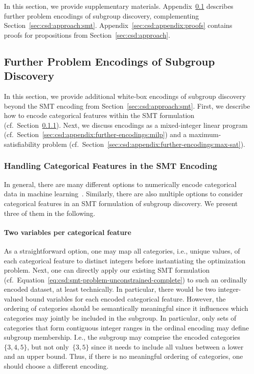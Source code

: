 \documentclass{article}
\theoremstyle{definition}
\begin{document}
In this section, we provide supplementary materials.
Appendix~\ref{sec:csd:appendix:further-encodings} describes further problem encodings of subgroup discovery, complementing Section~\ref{sec:csd:approach:smt}.
Appendix~\ref{sec:csd:appendix:proofs} contains proofs for propositions from Section~\ref{sec:csd:approach}.

\subsection{Further Problem Encodings of Subgroup Discovery}
\label{sec:csd:appendix:further-encodings}

In this section, we provide additional white-box encodings of subgroup discovery beyond the SMT encoding from Section~\ref{sec:csd:approach:smt}.
First, we describe how to encode categorical features within the SMT formulation (cf.~Section~\ref{sec:csd:appendix:further-encodings:smt-categorical}).
Next, we discuss encodings as a mixed-integer linear program (cf.~Section~\ref{sec:csd:appendix:further-encodings:milp}) and a maximum-satisfiability problem (cf.~Section~\ref{sec:csd:appendix:further-encodings:max-sat}).

\subsubsection{Handling Categorical Features in the SMT Encoding}
\label{sec:csd:appendix:further-encodings:smt-categorical}

In general, there are many different options to numerically encode categorical data in machine learning~\cite{matteucci2023benchmark}.
Similarly, there are also multiple options to consider categorical features in an SMT formulation of subgroup discovery.
We present three of them in the following.

\paragraph{Two variables per categorical feature}

As a straightforward option, one may map all categories, i.e., unique values, of each categorical feature to distinct integers before instantiating the optimization problem.
Next, one can directly apply our existing SMT formulation (cf.~Equation~\ref{eq:csd:smt-problem-unconstrained-complete}) to such an ordinally encoded dataset, at least technically.
In particular, there would be two integer-valued bound variables for each encoded categorical feature.
However, the ordering of categories should be semantically meaningful since it influences which categories may jointly be included in the subgroup.
In particular, only sets of categories that form contiguous integer ranges in the ordinal encoding may define subgroup membership.
I.e., the subgroup may comprise the encoded categories~$\{3,4,5\}$, but not only~$\{3,5 \}$ since it needs to include all values between a lower and an upper bound.
Thus, if there is no meaningful ordering of categories, one should choose a different encoding.
\end{document}

